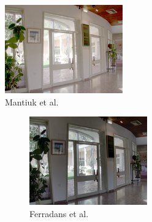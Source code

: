 \begin{figure}
\begin{subfigure}[b]{0.33\textwidth}
    \includegraphics[width=\textwidth]{figures/chapter2/tmos44/44_mantiuk08.png}
    \caption{Mantiuk et al.~\cite{mantiuk2008display}}
\end{subfigure}\hfill
\begin{subfigure}[t]{\textwidth}
\centering
    \begin{subfigure}[t]{0.33\textwidth}
    \includegraphics[width=\textwidth]{figures/chapter2/tmos44/44_ferradans11.png}
    \caption{Ferradans et al.~\cite{ferradans2011analysis}}
\end{subfigure}\hspace{-1pt}
\begin{subfigure}[t]{0.33\textwidth}

\end{subfigure}
\end{subfigure}
\end{figure}
